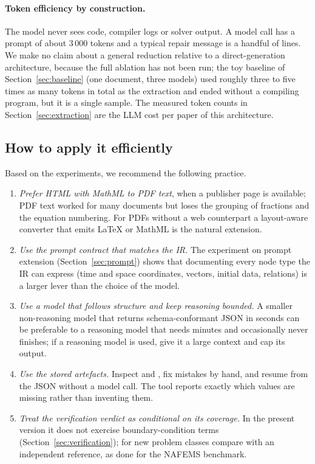 \paragraph{Token efficiency by construction.} The model never sees code, compiler logs or solver output. A model call has a prompt of about $3\,000$ tokens and a typical repair message is a handful of lines. We make no claim about a general reduction relative to a direct-generation architecture, because the full ablation has not been run; the toy baseline of Section~\ref{sec:baseline} (one document, three models) used roughly three to five times as many tokens in total as the extraction and ended without a compiling program, but it is a single sample. The measured token counts in Section~\ref{sec:extraction} are the LLM cost per paper of this architecture.

\subsection{How to apply it efficiently}
Based on the experiments, we recommend the following practice.
\begin{enumerate}
\item \emph{Prefer HTML with MathML to PDF text}, when a publisher page is available; PDF text worked for many documents but loses the grouping of fractions and the equation numbering. For PDFs without a web counterpart a layout-aware converter that emits LaTeX or MathML is the natural extension.
\item \emph{Use the prompt contract that matches the IR.} The experiment on prompt extension (Section~\ref{sec:prompt}) shows that documenting every node type the IR can express (time and space coordinates, vectors, initial data, relations) is a larger lever than the choice of the model.
\item \emph{Use a model that follows structure and keep reasoning bounded.} A smaller non-reasoning model that returns schema-conformant JSON in seconds can be preferable to a reasoning model that needs minutes and occasionally never finishes; if a reasoning model is used, give it a large context and cap its output.
\item \emph{Use the stored artefacts.} Inspect  and , fix mistakes by hand, and resume from the JSON without a model call. The tool reports exactly which values are missing rather than inventing them.
\item \emph{Treat the verification verdict as conditional on its coverage.} In the present version it does not exercise boundary-condition terms (Section~\ref{sec:verification}); for new problem classes compare with an independent reference, as done for the NAFEMS benchmark.
\end{enumerate}

